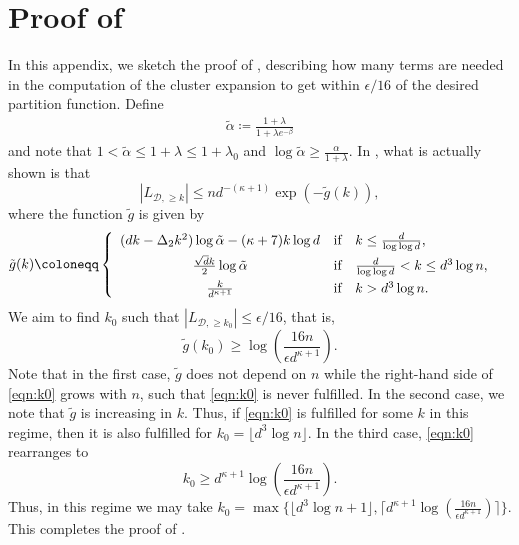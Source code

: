 \documentclass[reqno,a4paper,11pt]{amsart}
\newcommand{\cD}{\mathcal{D}}
\newcommand{\ta}{\tilde{\alpha}}
\newcommand{\lam}{\lambda}
\newcommand{\ex}{\kappa}
\newcommand{\codeg}{\Delta_2}
\begin{document}
\section{Proof of }\label{sec:appendix_tails}
In this appendix, we sketch the proof of , describing how many terms are needed in the computation of the cluster expansion to get within $\epsilon/16$ of the desired partition function. Define 
\begin{align*}
    \tilde \alpha \coloneqq \frac{1+\lambda}{1+\lambda e^{-\beta}}
\end{align*}
and note that $1 < \tilde \alpha \le 1+\lambda \le 1+\lam_0$ and $\log \tilde \alpha \ge \frac{\alpha}{1+\lambda}$. In \cite[Proof of Lemma 3.2, see Section 8]{GeKaSaWdo25}, what is actually shown is that
\begin{equation*}
    |L_{\cD,\geq k}|\leq nd^{-(\ex+1)}\exp{(-\tilde g(k))},
\end{equation*}
where the function $\tilde g$ is given by
\begin{align*}
\tilde{g}(k) &\coloneqq     \left\{\begin{array} {c@{\quad \textup{if} \quad}l}
       (d k -\codeg k^2)\log\ta - (\ex+7) k \log d & k \leq \frac{d}{\log \log d}, \\[+1ex]
      \frac{\sqrt{d} k}{2} \log\ta & \frac{d}{\log \log d} < k \le d^3 \log n, \\[+1ex]
      \frac{k}{d^{\ex+1}} & k > d^3 \log n.
    \end{array}\right.
\end{align*}
We aim to find $k_0$ such that $|L_{\cD,\geq k_0}|\leq \epsilon/16$, that is,
\begin{equation}\label{eqn:k0}
    \tilde g(k_0)\geq \log\left(\frac{16n}{\epsilon d^{\ex+1}}\right).
\end{equation}
Note that in the first case, $\tilde{g}$ does not depend on $n$ while the right-hand side of \eqref{eqn:k0} grows with $n$, such that \eqref{eqn:k0} is never fulfilled. In the second case, we note that $\tilde{g}$ is increasing in $k$. Thus, if \eqref{eqn:k0} is fulfilled for some $k$ in this regime, then it is also fulfilled for $k_0=\lfloor d^3 \log n \rfloor$.
In the third case, \eqref{eqn:k0} rearranges to
\begin{equation*}
    k_0\geq d^{\ex+1}\log\left(\frac{16n}{\epsilon d^{\ex+1}}\right).
\end{equation*}
Thus, in this regime we may take $k_0=\max\{\lfloor d^3 \log n +1 \rfloor, \lceil d^{\ex+1}\log\left(\frac{16n}{\epsilon d^{\ex+1}}\right) \rceil \}$. This completes the proof of .
\end{document}
